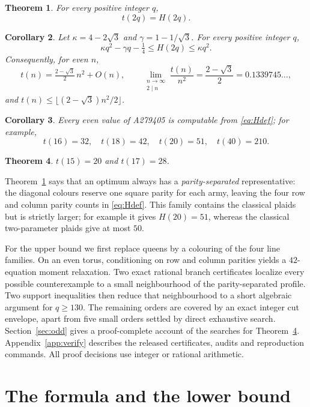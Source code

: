 \documentclass[11pt]{amsart}
\newtheorem{theorem}{Theorem}
\newtheorem{corollary}[theorem]{Corollary}
\theoremstyle{definition}
\theoremstyle{remark}
\begin{document}
\begin{theorem}\label{thm:main}
For every positive integer $q$,
\[
t(2q)=H(2q).
\]
\end{theorem}

\begin{corollary}\label{cor:asym}
Let $\kappa=4-2\sqrt3$ and $\gamma=1-1/\sqrt3$.  For every positive
integer $q$,
\[
\kappa q^2-\gamma q-\tfrac14\le H(2q)\le\kappa q^2.
\]
Consequently, for even $n$,
\[
t(n)=\tfrac{2-\sqrt3}{2}\,n^2+O(n),
\qquad
\lim_{\substack{n\to\infty\\2\mid n}}\frac{t(n)}{n^2}
=\frac{2-\sqrt3}{2}=0.1339745\ldots,
\]
and $t(n)\le\lfloor(2-\sqrt3)n^2/2\rfloor$.
\end{corollary}

\begin{corollary}\label{cor:values}
Every even value of A279405 is computable from \eqref{eq:Hdef}; for example,
\[
t(16)=32,\quad t(18)=42,\quad t(20)=51,\quad t(40)=210 .
\]
\end{corollary}

\begin{theorem}\label{thm:oddmain}
$t(15)=20$ and $t(17)=28$.
\end{theorem}

Theorem~\ref{thm:main} says that an optimum always has a
\emph{parity-separated} representative: the diagonal colours reserve one
square parity for each army, leaving the four row and column parity counts in
\eqref{eq:Hdef}.  This family contains the classical plaids but is strictly
larger; for example it gives $H(20)=51$, whereas the classical two-parameter
plaids give at most $50$.

For the upper bound we first replace queens by a colouring of the four line
families.  On an even torus, conditioning on row and column parities yields a
$42$-equation moment relaxation.  Two exact rational branch certificates
localize every possible counterexample to a small neighbourhood of the
parity-separated profile.  Two support inequalities then reduce that
neighbourhood to a short algebraic argument for $q\ge130$.  The remaining
orders are covered by an exact integer cut envelope, apart from five small
orders settled by direct exhaustive search.  Section~\ref{sec:odd} gives a
proof-complete account of the searches for Theorem~\ref{thm:oddmain}.
Appendix~\ref{app:verify} describes the released certificates, audits and
reproduction commands.  All proof decisions use integer or rational
arithmetic.

\section{The formula and the lower bound}\label{sec:formula}
\end{document}
